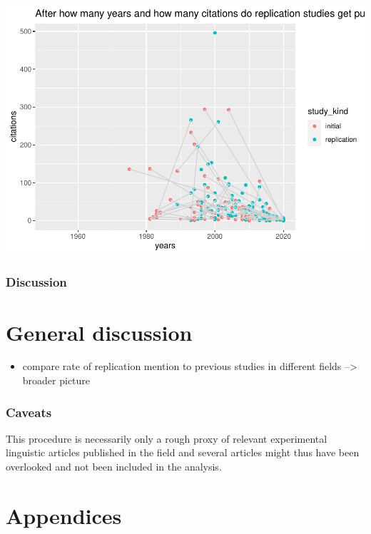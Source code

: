 \documentclass[]{elsarticle} %
\providecommand{\tightlist}{%
  \setlength{\itemsep}{0pt}\setlength{\parskip}{0pt}}
\begin{document}
\includegraphics{ReplicationLing_files/figure-latex/plot cit and years all-1.pdf}

\hypertarget{discussion-1}{%
\subsubsection{Discussion}\label{discussion-1}}

\hypertarget{general-discussion}{%
\section{General discussion}\label{general-discussion}}

\begin{itemize}
\tightlist
\item
  compare rate of replication mention to previous studies in different
  fields --\textgreater{} broader picture
\end{itemize}

\hypertarget{caveats}{%
\subsubsection{Caveats}\label{caveats}}

This procedure is necessarily only a rough proxy of relevant
experimental linguistic articles published in the field and several
articles might thus have been overlooked and not been included in the
analysis.

\hypertarget{appendices}{%
\section{Appendices}\label{appendices}}
\end{document}
